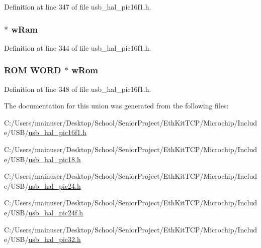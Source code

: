 Definition at line 347 of file usb\+\_\+hal\+\_\+pic16f1.\+h.

\hypertarget{union___p_o_i_n_t_e_r_a7e771c6c6b7a63de1c58c40c0184262e}{}
\subsubsection[{w\+Ram}]{ $\ast$ w\+Ram}\label{union___p_o_i_n_t_e_r_a7e771c6c6b7a63de1c58c40c0184262e}


Definition at line 344 of file usb\+\_\+hal\+\_\+pic16f1.\+h.

\hypertarget{union___p_o_i_n_t_e_r_ae5e8843a13f42cbfef8a565d473a3782}{}
\subsubsection[{w\+Rom}]{\setlength{\rightskip}{0pt plus 5cm}R\+O\+M {\bf W\+O\+R\+D} $\ast$ w\+Rom}\label{union___p_o_i_n_t_e_r_ae5e8843a13f42cbfef8a565d473a3782}


Definition at line 348 of file usb\+\_\+hal\+\_\+pic16f1.\+h.



The documentation for this union was generated from the following files\+:\begin{DoxyCompactItemize}
\item 
C\+:/\+Users/mainuser/\+Desktop/\+School/\+Senior\+Project/\+Eth\+Kit\+T\+C\+P/\+Microchip/\+Include/\+U\+S\+B/\hyperlink{usb__hal__pic16f1_8h}{usb\+\_\+hal\+\_\+pic16f1.\+h}\item 
C\+:/\+Users/mainuser/\+Desktop/\+School/\+Senior\+Project/\+Eth\+Kit\+T\+C\+P/\+Microchip/\+Include/\+U\+S\+B/\hyperlink{usb__hal__pic18_8h}{usb\+\_\+hal\+\_\+pic18.\+h}\item 
C\+:/\+Users/mainuser/\+Desktop/\+School/\+Senior\+Project/\+Eth\+Kit\+T\+C\+P/\+Microchip/\+Include/\+U\+S\+B/\hyperlink{usb__hal__pic24_8h}{usb\+\_\+hal\+\_\+pic24.\+h}\item 
C\+:/\+Users/mainuser/\+Desktop/\+School/\+Senior\+Project/\+Eth\+Kit\+T\+C\+P/\+Microchip/\+Include/\+U\+S\+B/\hyperlink{usb__hal__pic24f_8h}{usb\+\_\+hal\+\_\+pic24f.\+h}\item 
C\+:/\+Users/mainuser/\+Desktop/\+School/\+Senior\+Project/\+Eth\+Kit\+T\+C\+P/\+Microchip/\+Include/\+U\+S\+B/\hyperlink{usb__hal__pic32_8h}{usb\+\_\+hal\+\_\+pic32.\+h}\end{DoxyCompactItemize}
